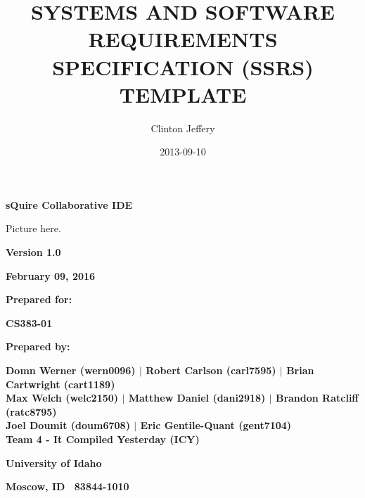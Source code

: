 \documentclass[twoside,letterpaper]{article}
\title{SYSTEMS AND SOFTWARE REQUIREMENTS SPECIFICATION (SSRS) TEMPLATE}
\author{Clinton Jeffery}
\date{2013-09-10}
\begin{document}
\clearpage\setcounter{page}{1}\pagestyle{Standard}




\bigskip

{\centering\bfseries
sQuire Collaborative IDE
\par}


\bigskip


\bigskip


\bigskip

\begin{center}
Picture here.
\end{center}

\bigskip


\bigskip

{\centering\bfseries
Version 1.0
\par}

{\centering\bfseries
February 09, 2016
\par}


\bigskip


\bigskip

{\centering\bfseries
Prepared for:
\par}

{\centering\bfseries
CS383-01
\par}


\bigskip


\bigskip

{\centering\bfseries
Prepared by:
\par}

{\centering\bfseries
Domn Werner (wern0096) $\vert$ Robert Carlson (carl7595) $\vert$ Brian Cartwright (cart1189) \\ Max Welch (welc2150) $\vert$ Matthew Daniel (dani2918) $\vert$ Brandon Ratcliff (ratc8795) \\ Joel Doumit (doum6708) $\vert$ Eric Gentile-Quant (gent7104) \\
Team 4 - It Compiled Yesterday (ICY)
\par}

{\centering\bfseries
University of Idaho
\par}

{\centering\bfseries
Moscow, ID \ 83844-1010
\par}



\bigskip
\end{document}
